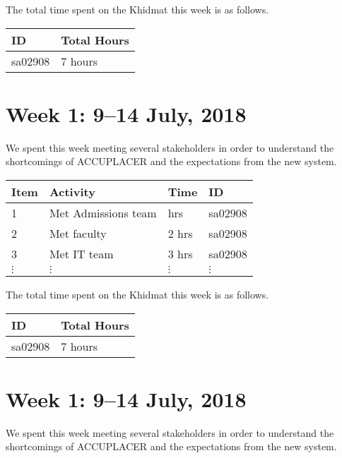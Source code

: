 \documentclass{article}
\begin{document}
The total time spent on the Khidmat this week is as follows.

\begin{tabular}{|l|l|}
  \hline
  ID & Total Hours\\\hline\hline
  sa02908 & 7 hours\\\hline
\end{tabular}


\newpage %
\section*{Week 1: 9--14 July, 2018}

We spent this week meeting several stakeholders in order to understand the shortcomings of ACCUPLACER and the expectations from the new system.

\begin{tabular}{|l|l|l|l|}
  \hline
  Item  & Activity & Time & ID \\\hline\hline
  1 & Met Admissions team & hrs & sa02908 \\\hline
  2 & Met faculty & 2 hrs & sa02908 \\\hline
  3 & Met IT team & 3 hrs & sa02908 \\\hline
  $\vdots$ & $\vdots$ & $\vdots$ & $\vdots$ \\\hline
\end{tabular}

The total time spent on the Khidmat this week is as follows.

\begin{tabular}{|l|l|}
  \hline
  ID & Total Hours\\\hline\hline
  sa02908 & 7 hours\\\hline
\end{tabular}


\newpage %
\section*{Week 1: 9--14 July, 2018}

We spent this week meeting several stakeholders in order to understand the shortcomings of ACCUPLACER and the expectations from the new system.
\end{document}
